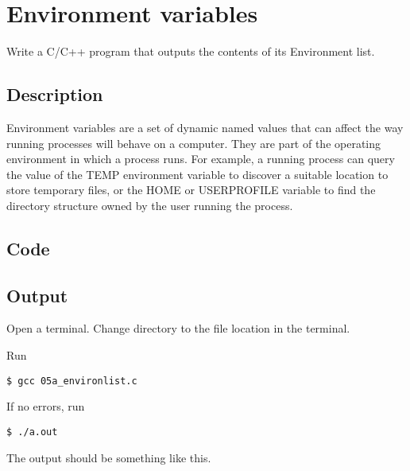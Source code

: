 \chapter{Environment variables}

Write a C/C++ program that outputs the contents of its Environment list.

\section{Description}


Environment variables are a set of dynamic named values that can affect the way running processes will behave on a computer. They are part of the operating environment in which a process runs. For example, a running process can query the value of the TEMP environment variable to discover a suitable location to store temporary files, or the HOME or USERPROFILE variable to find the directory structure owned by the user running the process.
	

\section{Code}



\section{Output}

Open a terminal. Change directory to the file location in the terminal.

Run
\begin{lstlisting}[style=shell-command]
$ gcc 05a_environlist.c
\end{lstlisting}

If no errors, run
\begin{lstlisting}[style=shell-command]
$ ./a.out
\end{lstlisting}

The output should be something like this.

